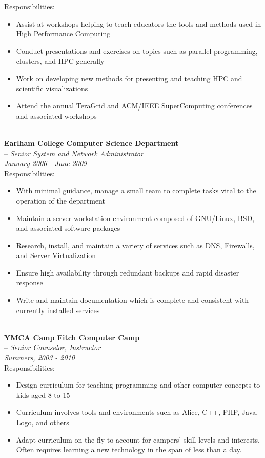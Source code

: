 \documentclass[10pt]{article}
\begin{document}
\indent Responsibilities:
\begin{itemize}
  \addtolength{\itemsep}{-2mm}
    \item \indent Assist at workshops helping to teach educators the tools and methods used in High Performance Computing
    \item \indent Conduct presentations and exercises on topics such as parallel programming, clusters, and HPC generally
    \item \indent Work on developing new methods for presenting and teaching HPC and scientific visualizations
    \item \indent Attend the annual TeraGrid and ACM/IEEE SuperComputing conferences and associated workshops
\end{itemize}
~\\
\indent\textbf{Earlham College Computer Science Department}~\\
\indent \indent -- \emph{Senior System and Network Administrator}~\\
\indent\textit{January 2006 - June 2009}~\\
\indent Responsibilities:
  \begin{itemize}
  \addtolength{\itemsep}{-2mm}
    \item \indent With minimal guidance, manage a small team to complete tasks vital to the operation of the department
    \item \indent Maintain a server-workstation environment composed of GNU/Linux, BSD, and associated software packages
    \item \indent Research, install, and maintain a variety of services such as DNS, Firewalls, and Server Virtualization
    \item \indent Ensure high availability through redundant backups and rapid disaster response
    \item \indent Write and maintain documentation which is complete and consistent with currently installed services
  \end{itemize}
~\\
\indent\textbf{YMCA Camp Fitch Computer Camp}~\\
\indent \indent -- \emph{Senior Counselor, Instructor}~\\
\indent\textit{Summers, 2003 - 2010}~\\
\indent Responsibilities:
  \begin{itemize}
  \addtolength{\itemsep}{-2mm}
    \item \indent Design curriculum for teaching programming and other computer concepts to kids aged 8 to 15
    \item \indent Curriculum involves tools and environments such as Alice, C++, PHP, Java, Logo, and others
    \item \indent Adapt curriculum on-the-fly to account for campers' skill levels and interests. Often requires learning a new technology in the span of less than a day.
  \end{itemize}
\end{document}
